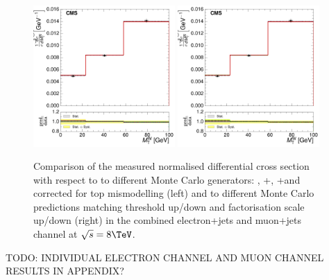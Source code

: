 \begin{figure}[hbtp]
    \centering
     \includegraphics[width=0.48\textwidth]{Chapters/04_Analysis/04b_XSections/images/results/8TeV/MT/central/normalised_xsection_combined_different_generators.pdf}\hfill
     \includegraphics[width=0.48\textwidth]{Chapters/04_Analysis/04b_XSections/images/results/8TeV/MT/central/normalised_xsection_combined_systematics_shifts.pdf}\hfill
     \caption{Comparison of the measured normalised differential cross section with respect to \mt to
     different Monte Carlo generators: \MADGRAPH, \POWHEG+\HERWIG, \POWHEG+\PYTHIA and \MADGRAPH corrected for
     top \pt mismodelling (left) and to different Monte Carlo predictions matching threshold up/down and
     factorisation scale up/down (right) in the combined electron+jets and muon+jets channel at
     $\sqrt{s}=8\TeV$.}
     \label{fig:result_WPT_8TeV_combined}
\end{figure}

TODO: INDIVIDUAL ELECTRON CHANNEL AND MUON CHANNEL RESULTS IN APPENDIX? 
